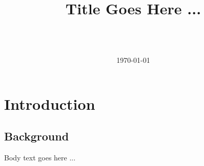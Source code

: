 \documentclass{myreport}
\title{\huge{\textbf{Title Goes Here ...}}}
\author{\name \\ \affiliation \\ \email}
\date{\today}
\begin{document}
\maketitle
\tableofcontents
\newpage

% 

\chapter{Introduction}
\section{Background}

Body text goes here ...

\lipsum[1-3]

\end{document}
